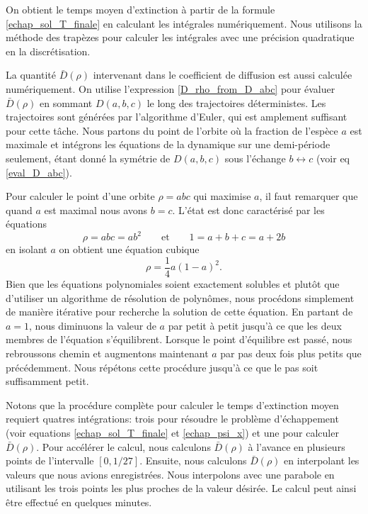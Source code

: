 \documentclass[openany,a4paper,12pt]{article}
\begin{document}
\par On obtient le temps moyen d'extinction à partir de la formule \ref{echap_sol_T_finale} en calculant les intégrales numériquement. Nous utilisons la méthode des trapèzes pour calculer les intégrales avec une précision quadratique en la discrétisation.

\par La quantité $\bar D(\rho)$ intervenant dans le coefficient de diffusion est aussi calculée numériquement. On utilise l'expression \ref{D_rho_from_D_abc} pour évaluer $\bar D(\rho)$ en sommant $D(a,b,c)$ le long des trajectoires déterministes. Les trajectoires sont générées par l'algorithme d'Euler, qui est amplement suffisant pour cette tâche. Nous partons du point de l'orbite où la fraction de l'espèce $a$ est maximale et intégrons les équations de la dynamique sur une demi-période seulement, étant donné la symétrie de $D(a,b,c)$ sous l'échange $b\leftrightarrow c$ (voir eq \ref{eval_D_abc}).

\par Pour calculer le point d'une orbite $\rho = abc$ qui maximise $a$, il faut remarquer que quand $a$ est maximal nous avons $b=c$. L'état est donc caractérisé par les équations 
%
\begin{equation}\label{syst_a_max}
	\rho = abc = ab^2  \qquad \text{et} \qquad 1 = a+b+c = a+2b
\end{equation}
%
en isolant $a$ on obtient une équation cubique 
%
\begin{equation}\label{eq_a_max}
	\rho = \frac 14 a (1-a)^2.
\end{equation}
%
Bien que les équations polynomiales soient exactement solubles et plutôt que d'utiliser un algorithme de résolution de polynômes, nous procédons simplement de manière itérative pour recherche la solution de cette équation. En partant de $a=1$, nous diminuons la valeur de $a$ par petit à petit jusqu'à ce que les deux membres de l'équation s'équilibrent. Lorsque le point d'équilibre est passé, nous rebroussons chemin et augmentons maintenant $a$ par pas deux fois plus petits que précédemment. Nous répétons cette procédure jusqu'à ce que le pas soit suffisamment petit.

\par Notons que la procédure complète pour calculer le temps d'extinction moyen requiert quatres intégrations: trois pour résoudre le problème d'échappement (voir equations \ref{echap_sol_T_finale} et \ref{echap_psi_x}) et une pour calculer $\bar D(\rho)$. Pour accélérer le calcul, nous calculons $\bar D(\rho)$ à l'avance en plusieurs points de l'intervalle $[0,1/27]$. Ensuite, nous calculons $\bar D(\rho)$ en interpolant les valeurs que nous avions enregistrées. Nous interpolons avec une parabole en utilisant les trois points les plus proches de la valeur désirée. Le calcul peut ainsi être effectué en quelques minutes.
\end{document}
